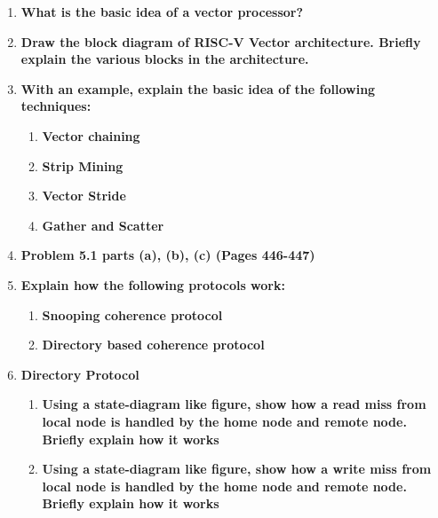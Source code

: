 \begin{enumerate}
    \item \textbf{What is the basic idea of a vector processor?}
    \item \textbf{Draw the block diagram of RISC-V Vector architecture. Briefly explain the various blocks in the architecture.}
    \item \textbf{With an example, explain the basic idea of the following techniques:}
    \begin{enumerate}
        \item \textbf{Vector chaining}
        \item \textbf{Strip Mining}
        \item \textbf{Vector Stride}
        \item \textbf{Gather and Scatter}
    \end{enumerate}
    \item \textbf{Problem 5.1 parts (a), (b), (c) (Pages 446-447)}
    \item \textbf{Explain how the following protocols work:}
    \begin{enumerate}
        \item \textbf{Snooping coherence protocol}
        \item \textbf{Directory based coherence protocol}
    \end{enumerate}
    \item \textbf{Directory Protocol}
    \begin{enumerate}
        \item \textbf{Using a state-diagram like figure, show how a read miss from local node is handled by the home node and remote node. Briefly explain how it works}
        \item \textbf{Using a state-diagram like figure, show how a write miss from local node is handled by the home node and remote node. Briefly explain how it works}
    \end{enumerate}
\end{enumerate}